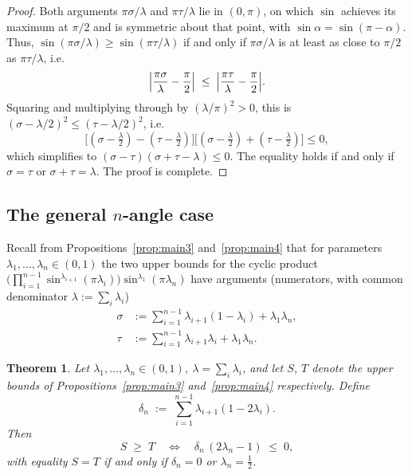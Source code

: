 \documentclass[12pt]{amsart}
\newtheorem{theorem}{Theorem}[section]
\theoremstyle{definition}
\begin{document}
\begin{proof}
Both arguments $\pi\sigma/\lambda$ and $\pi\tau/\lambda$ lie in
$(0,\pi)$, on which $\sin$ achieves its maximum at $\pi/2$ and is
symmetric about that point, with $\sin\alpha=\sin(\pi-\alpha)$.
Thus, $\sin(\pi\sigma/\lambda)\geq\sin(\pi\tau/\lambda)$ if and only
if $\pi\sigma/\lambda$ is at least as close to $\pi/2$ as
$\pi\tau/\lambda$, i.e.\
\[
  \Bigl|\frac{\pi\sigma}{\lambda}-\frac{\pi}{2}\Bigr|
  \;\leq\;
  \Bigl|\frac{\pi\tau}{\lambda}-\frac{\pi}{2}\Bigr|.
\]
Squaring and multiplying through by $(\lambda/\pi)^2>0$, this is
$(\sigma-\lambda/2)^2\leq(\tau-\lambda/2)^2$, i.e.\
\[
  \bigl[(\sigma-\tfrac\lambda2)-(\tau-\tfrac\lambda2)\bigr]
  \bigl[(\sigma-\tfrac\lambda2)+(\tau-\tfrac\lambda2)\bigr]\leq 0,
\]
which simplifies to $(\sigma-\tau)(\sigma+\tau-\lambda)\leq 0$.
The equality holds if and only if $\sigma=\tau$ or $\sigma+\tau=\lambda$. The proof is complete.
\end{proof}

\subsection{The general \texorpdfstring{$n$}{n}-angle case}\label{sec:nangle}

Recall from Propositions~\ref{prop:main3} and~\ref{prop:main4} that
for parameters $\lambda_1,\ldots,\lambda_n\in(0,1)$ the two upper
bounds for the cyclic product
$\bigl(\displaystyle\prod_{i=1}^{n-1}\sin^{\lambda_{i+1}}(\pi\lambda_i)\bigr)
\sin^{\lambda_1}(\pi\lambda_n)$
have arguments (numerators, with common denominator $\lambda:=\sum_i\lambda_i$)
\begin{align*}
  \sigma &:= \sum_{i=1}^{n-1}\lambda_{i+1}(1-\lambda_i)+\lambda_1\lambda_n,\\
  \tau   &:= \sum_{i=1}^{n-1}\lambda_{i+1}\lambda_i +\lambda_1\lambda_n.
\end{align*}

\begin{theorem}\label{thm:compare_n}
Let $\lambda_1,\ldots,\lambda_n\in(0,1)$, $\lambda=\sum_i\lambda_i$,
and let $S$, $T$ denote the upper bounds of
Propositions~\ref{prop:main3} and~\ref{prop:main4} respectively.
Define
\begin{equation}\label{eq:delta_n}
  \delta_n \;:=\; \sum_{i=1}^{n-1}\lambda_{i+1}(1-2\lambda_i).
\end{equation}
Then
\begin{equation}\label{eq:compare_n}
  S \;\geq\; T
  \quad\Longleftrightarrow\quad
  \delta_n\,(2\lambda_n-1) \;\leq\; 0,
\end{equation}
with equality $S=T$ if and only if $\delta_n=0$ or $\lambda_n=\tfrac12$.
\end{theorem}
\end{document}
